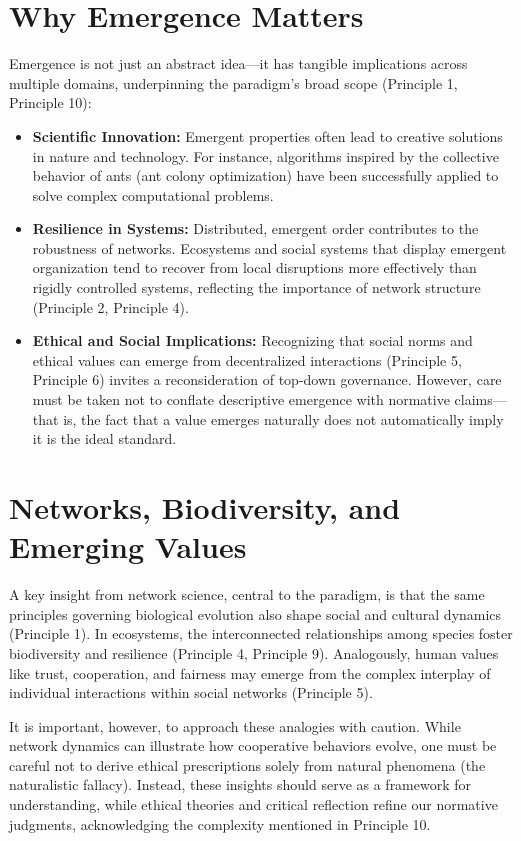 \section*{Why Emergence Matters}
Emergence is not just an abstract idea---it has tangible implications across multiple domains, underpinning the paradigm's broad scope (Principle 1, Principle 10):
\begin{itemize}
    \item \textbf{Scientific Innovation:} Emergent properties often lead to creative solutions in nature and technology. For instance, algorithms inspired by the collective behavior of ants (ant colony optimization) have been successfully applied to solve complex computational problems.
    \item \textbf{Resilience in Systems:} Distributed, emergent order contributes to the robustness of networks. Ecosystems and social systems that display emergent organization tend to recover from local disruptions more effectively than rigidly controlled systems, reflecting the importance of network structure (Principle 2, Principle 4).
    \item \textbf{Ethical and Social Implications:} Recognizing that social norms and ethical values can emerge from decentralized interactions (Principle 5, Principle 6) invites a reconsideration of top-down governance. However, care must be taken not to conflate descriptive emergence with normative claims---that is, the fact that a value emerges naturally does not automatically imply it is the ideal standard.
\end{itemize} %

\section*{Networks, Biodiversity, and Emerging Values}
A key insight from network science, central to the paradigm, is that the same principles governing biological evolution also shape social and cultural dynamics (Principle 1). In ecosystems, the interconnected relationships among species foster biodiversity and resilience (Principle 4, Principle 9). Analogously, human values like trust, cooperation, and fairness may emerge from the complex interplay of individual interactions within social networks (Principle 5).

It is important, however, to approach these analogies with caution. While network dynamics can illustrate how cooperative behaviors evolve, one must be careful not to derive ethical prescriptions solely from natural phenomena (the naturalistic fallacy). Instead, these insights should serve as a framework for understanding, while ethical theories and critical reflection refine our normative judgments, acknowledging the complexity mentioned in Principle 10. %

